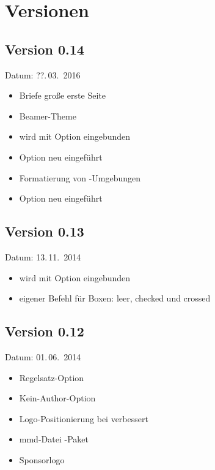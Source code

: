 
\cleardoublepage
\section{Versionen}

\subsection{Version 0.14}

Datum: ??.\,03.~2016

\begin{itemize}
	\item Briefe große erste Seite
	\item Beamer-Theme
	\item {} wird mit Option  eingebunden
	\item Option  neu eingeführt
	\item Formatierung von -Umgebungen
	\item Option  neu eingeführt
\end{itemize}

\subsection{Version 0.13}

Datum: 13.\,11.~2014

\begin{itemize}
	\item {} wird mit Option  eingebunden
	\item eigener Befehl  für Boxen: leer, checked und crossed
\end{itemize}

\subsection{Version 0.12}

Datum: 01.\,06.~2014

\begin{itemize}
	\item Regelsatz-Option 
	\item Kein-Author-Option 
	\item Logo-Positionierung bei  verbessert
	\item mmd-Datei -Paket
	\item Sponsorlogo
\end{itemize}

